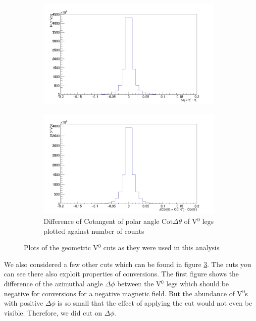 \begin{figure}
\begin{subfigure}[h]{.4\linewidth}
\includegraphics[width=1.0\linewidth]{Figures/additionalV0cuts/DeltaEta.png}
\caption{}
\label{fig:DEta}
\end{subfigure}\hspace{1cm}%
\begin{subfigure}[h]{.4\linewidth}
\includegraphics[width=1.0\linewidth]{Figures/additionalV0cuts/DeltaCotTheta.png}
\caption{Difference of Cotangent of polar angle $\mathrm{Cot}\Delta\theta$ of V$^0$ legs plotted against number of counts}
\label{fig:DCotTheta}
\end{subfigure}
\vspace{0.5cm}
\caption{Plots of the geometric V$^0$ cuts as they were used in this analysis}
\label{fig:addV0cuts}
\end{figure}
We also considered a few other cuts which can be found in figure \ref{fig:addV0cuts}. The cuts you can see there also exploit properties of conversions. The first figure shows the difference of the azimuthal angle $\Delta\phi$ between the V$^0$ legs which should be negative for conversions for a negative magnetic field. But the abundance of V$^0$s with positive $\Delta\phi$ is so small that the effect of applying the cut would not even be visible. Therefore, we did cut on $\Delta\phi$. \\
